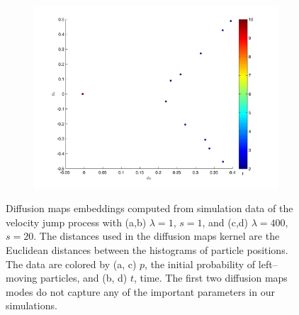 \documentclass[12pt]{article}
\begin{document}
\begin{figure}[htb]
\begin{subfigure}{0.5\textwidth}
\caption{}
\end{subfigure}
\begin{subfigure}{0.5\textwidth}
\includegraphics[width=\textwidth]{rawhist_t_400}
\caption{}
\end{subfigure}
\caption{Diffusion maps embeddings computed from simulation data of the velocity jump process with (a,b) $\lambda=1$, $s=1$, and (c,d) $\lambda=400$, $s=20$. The distances used in the diffusion maps kernel are the Euclidean distances between the histograms of particle positions. The data are colored by (a, c) $p$, the initial probability of left--moving particles, and (b, d) $t$, time. The first two diffusion maps modes do not capture any of the important parameters in our simulations.}
\label{fig:dmaps_embed}
\end{figure}
\end{document}

